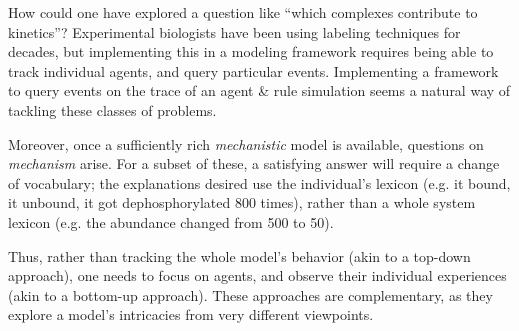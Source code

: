 \documentclass[runningheads]{llncs}
\begin{document}
How could one have explored a question like ``which complexes contribute to kinetics''? Experimental biologists have been using labeling techniques for decades, but implementing this in a modeling framework requires being able to track individual agents, and query particular events. Implementing a framework to query events on the trace of an agent \& rule simulation seems a natural way of tackling these classes of problems.

Moreover, once a sufficiently rich \emph{mechanistic} model is available, questions on \emph{mechanism} arise. For a subset of these, a satisfying answer will require a change of vocabulary; the explanations desired use the individual's lexicon (e.g. it bound, it unbound, it got dephosphorylated 800 times), rather than a whole system lexicon (e.g. the abundance changed from 500 to 50).

Thus, rather than tracking the whole model's behavior (akin to a top-down approach), one needs to focus on agents, and observe their individual experiences (akin to a bottom-up approach). These approaches are complementary, as they explore a model's intricacies from very different viewpoints.



% 



\nocite{*}  

\newpage

\appendix

%
\end{document}

